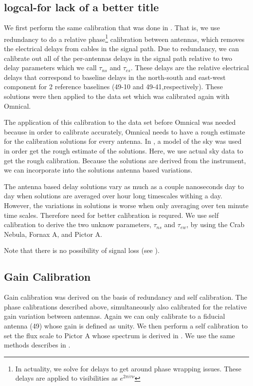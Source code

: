 \documentclass[twocolumn,numberedappendix]{emulateapj}
\begin{document}
\subsection{logcal-for lack of a better title}
We first perform the same calibration that was
done in \citep{parsons_et_al2014a}. That is, we use redundancy to do a relative
phase\footnote{In actuality, we solve for delays to get around phase wrapping
issues. These delays are applied to visibilities as $e^{2\pi{i}\tau\nu}$}
calibration between antennas, which removes the electrical delays from cables in
the signal path. Due to redundancy, we can calibrate out all of the per-antennas
delays in the signal path relative to two delay parameters which we call
$\tau_{ns}$ and $\tau_{es}$. These delays are the relative electrical delays
that correspond to baseline delays in the north-south and east-west component
for 2 reference baselines (49-10 and 49-41,respectively). These solutions were
then applied to the data set which was calibrated again with Omnical. 

The application of this calibration to the data set before Omnical was needed
because in order to calibrate accurately, Omnical needs to have a rough estimate
for the calibration solutions for every antenna. In \cite{zheng_et_al2014}, a
model of the sky was used in order get the rough estimate of the solutions.
Here, we use actual sky data to get the rough calibration. Because the solutions
are derived from the instrument, we can incorporate into the solutions antenna
based variations. 
 
The antenna based
delay solutions vary as much as a couple nanoseconds day to day when solutions
are averaged over hour long timescales withing a day. However, the variations in
solutions is worse when only averaging over ten minute time scales. Therefore
need for better calibration is requred.  We use self calibration to derive the
two unknow parameters, $\tau_{ns}$ and $\tau_{ew}$, by using the Crab Nebula,
Fornax A, and Pictor A.

Note that there is no possibility of signal loss (see \citep{parsons_et_al2014a}).

\subsection{Gain Calibration}
Gain calibration was derived on the basis of redundancy and self calibration.
The phase calibrations described above, simultaneously also calibrated for the
relative gain variation between antennas. Again we can only calibrate to a fiducial
antenna (49) whose gain is defined as unity. We then perform a self calibration
to set the flux scale to Pictor A whose spectrum is derived in
\citep{jacobs_et_al2013}. We use the same methods describes in \citep{parsons_et_al2014a}.
\end{document}
